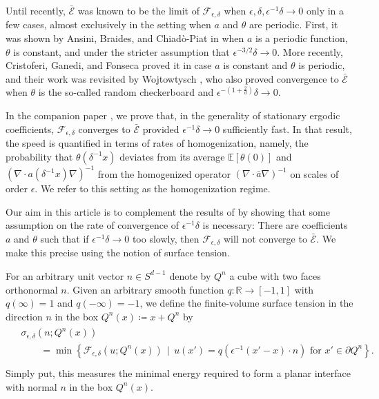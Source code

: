 \documentclass[12pt]{amsart}
\begin{document}
Until recently, $\bar{\mathscr{E}}$ was known to be the limit of $\mathscr{F}_{\epsilon,\delta}$ when $\epsilon , \delta , \epsilon^{-1} \delta \to 0$ only in a few cases, almost exclusively in the setting when $a$ and $\theta$ are periodic.  First, it was shown by Ansini, Braides, and Chiad\`{o}-Piat in \cite{ansini_braides_chiado-piat} when $a$ is a periodic function, $\theta$ is constant, and under the stricter assumption that $\epsilon^{-3/2} \delta \to 0$.  More recently, Cristoferi, Ganedi, and Fonseca \cite{cristoferi_fonseca_ganedi_supercritical} proved it in case $a$ is constant and $\theta$ is periodic, and their work was revisited by Wojtowtysch \cite{wojtowytsch}, who also proved convergence to $ \bar{\mathscr{E}}$ when $\theta$ is the so-called random checkerboard and $ \epsilon^{ - ( 1 + \frac{ 2 }{ d } ) } \delta \to 0 $. 

In the companion paper \cite{part1}, we prove that, in the generality of stationary ergodic coefficients, $\mathscr{F}_{\epsilon,\delta}$ converges to $\bar{\mathscr{E}}$ provided $\epsilon^{-1} \delta \to 0$ sufficiently fast. In that result, the speed is quantified in terms of rates of homogenization, namely, the probability that $\theta(\delta^{-1} x)$ deviates from its average $\mathbb{E} [ \theta (0) ]$ and $( \nabla \cdot a(\delta^{-1} x) \nabla )^{-1}$ from the homogenized operator  $( \nabla \cdot \bar{a} \nabla )^{-1}$ on scales of order $ \epsilon $. We refer to this setting as the homogenization regime.

Our aim in this article is to complement the results of \cite{part1} by showing that some assumption on the rate of convergence of $\epsilon^{-1} \delta$ is necessary: There are coefficients $a$ and $\theta$  such that if $\epsilon^{-1} \delta \to 0$ too slowly, then $\mathscr{F}_{\epsilon,\delta}$ will not converge to $\bar{ \mathscr{E} }$.  We make this precise using the notion of surface tension.  

For an arbitrary unit vector $n \in S^{d-1}$ denote by $Q^{ n } $ a cube with two faces orthonormal $ n $. Given an arbitrary smooth function $ q : \mathbb{R} \to [-1,1]$ with $q(\infty) = 1$ and $q(-\infty) = -1$, we define the finite-volume surface tension in the direction $n$ in the box $ Q^{ n } ( x ) \coloneqq x + Q^{n} $ by
	\begin{align}\label{eqn:surface-tension}
	\begin{aligned}
		& \sigma_{\epsilon,\delta}( n ; Q^{n} ( x ) ) \\ &\qquad = \min \left\{ \mathscr{F}_{\epsilon,\delta}(u; Q^{n} ( x ) )\, \mid \, u(x') = q( \epsilon^{-1} ( x' - x) \cdot n ) \, \, \text{for} \, \, x' \in \partial Q^{n}\right\}. \\
	\end{aligned}
	\end{align}
Simply put, this measures the minimal energy required to form a planar interface with normal $n$ in the box $ Q^{n} ( x ) $.
\end{document}
